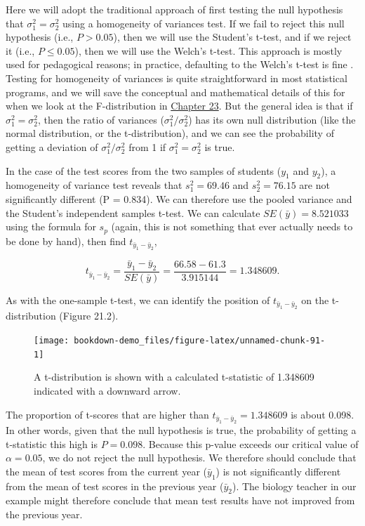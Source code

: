\documentclass[
]{scrbook}
\begin{document}
Here we will adopt the traditional approach of first testing the null hypothesis that \(\sigma^{2}_{1} = \sigma^{2}_{2}\) using a homogeneity of variances test.
If we fail to reject this null hypothesis (i.e., \(P > 0.05\)), then we will use the Student's t-test, and if we reject it (i.e., \(P \leq 0.05\)), then we will use the Welch's t-test.
This approach is mostly used for pedagogical reasons; in practice, defaulting to the Welch's t-test is fine \citep{Ruxton2006, Delacre2017}.
Testing for homogeneity of variances is quite straightforward in most statistical programs, and we will save the conceptual and mathematical details of this for when we look at the F-distribution in \protect\hyperlink{Chapter_23}{Chapter 23}.
But the general idea is that if \(\sigma^{2}_{1} = \sigma^{2}_{2}\), then the ratio of variances (\(\sigma^{2}_{1}/\sigma^{2}_{2}\)) has its own null distribution (like the normal distribution, or the t-distribution), and we can see the probability of getting a deviation of \(\sigma^{2}_{1}/\sigma^{2}_{2}\) from 1 if \(\sigma^{2}_{1} = \sigma^{2}_{2}\) is true.

In the case of the test scores from the two samples of students (\(y_{1}\) and \(y_{2}\)), a homogeneity of variance test reveals that \(s^{2}_{1} = 69.46\) and \(s^{2}_{2} = 76.15\) are not significantly different (P = 0.834).
We can therefore use the pooled variance and the Student's independent samples t-test.
We can calculate \(SE(\bar{y}) = 8.521033\) using the formula for \(s_{p}\) (again, this is not something that ever actually needs to be done by hand), then find \(t_{\bar{y}_{1} - \bar{y}_{2}}\),

\[t_{\bar{y}_{1} - \bar{y}_{2}} = \frac{\bar{y}_{1} - \bar{y}_{2}}{SE(\bar{y})} = \frac{66.58 - 61.3}{3.915144} = 1.348609.\]

As with the one-sample t-test, we can identify the position of \(t_{\bar{y}_{1} - \bar{y}_{2}}\) on the t-distribution (Figure 21.2).

\begin{figure}
\texttt{[image: bookdown-demo\_files/figure-latex/unnamed-chunk-91-1]} \caption{A t-distribution is shown with a calculated t-statistic of 1.348609 indicated with a downward arrow.}\label{fig:unnamed-chunk-91}
\end{figure}

The proportion of t-scores that are higher than \(t_{\bar{y}_{1} - \bar{y}_{2}} = 1.348609\) is about 0.098.
In other words, given that the null hypothesis is true, the probability of getting a t-statistic this high is \(P = 0.098\).
Because this p-value exceeds our critical value of \(\alpha = 0.05\), we do not reject the null hypothesis.
We therefore should conclude that the mean of test scores from the current year (\(\bar{y}_{1}\)) is not significantly different from the mean of test scores in the previous year (\(\bar{y}_{2}\)).
The biology teacher in our example might therefore conclude that mean test results have not improved from the previous year.
\end{document}
